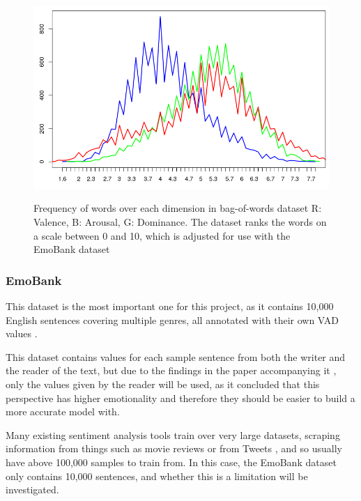 \begin{figure}[h]
\caption{Frequency of words over each dimension in bag-of-words dataset R: Valence, B: Arousal, G: Dominance. The dataset ranks the words on a scale between 0 and 10, which is adjusted for use with the EmoBank dataset}
\centering
\includegraphics[scale=0.4]{graphs/lexiconDist.png}
\label{lexiconGraph}
\end{figure}


\subsubsection{EmoBank}
This dataset is the most important one for this project, as it contains 10,000 English sentences covering multiple genres, all annotated with their own VAD values \cite{emoBank}.

This dataset contains values for each sample sentence from both the writer and the reader of the text, but due to the findings in the paper accompanying it \cite{emoBank}, only the values given by the reader will be used, as it concluded that this perspective has higher emotionality and therefore they should be easier to build a more accurate model with.

Many existing sentiment analysis tools train over very large datasets, scraping information from things such as movie reviews \cite{socher2013recursive} or from Tweets \cite{towardsDS}, and so usually have above 100,000 samples to train from. In this case, the EmoBank dataset only contains 10,000 sentences, and whether this is a limitation will be investigated.


